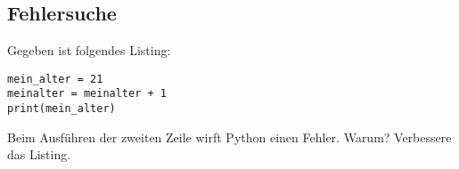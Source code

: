 \subsection{Fehlersuche}
Gegeben ist folgendes Listing:
\begin{lstlisting}
mein_alter = 21
meinalter = meinalter + 1
print(mein_alter)
\end{lstlisting}
Beim Ausführen der zweiten Zeile wirft Python einen Fehler. Warum? Verbessere das Listing.
